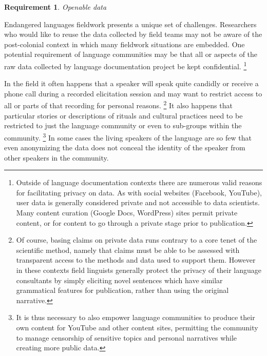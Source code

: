 \documentclass[11pt]{article}
\newtheorem{requirement}{Requirement}
\begin{document}




\begin{requirement}
	\label{req:openable}
       Openable data
\end{requirement}


Endangered languages fieldwork  presents a unique set of
challenges. 
Researchers who would like to reuse the data collected by field teams may not be aware of the
post-colonial context in which many fieldwork situations are embedded.
One potential requirement of language communities may be that all or aspects of
the raw data collected by language documentation project be kept confidential.%
\footnote{Outside of language documentation contexts there are numerous valid reasons for facilitating privacy on data.
As with social websites (Facebook, YouTube), user data is generally considered private and not accessible to data scientists.
Many content curation (Google Docs, WordPress) sites permit private content, or for content to go through a private stage prior to publication.}


In the field it often happens that a speaker will speak quite candidly or
receive a phone call  during a recorded elicitation session and may want to
restrict access to all or parts of that recording for personal reasons.%
\footnote{Of course, basing claims on private data runs contrary to a core
    tenet of the scientific method, namely that claims must be able to be
    assessed with transparent access to the methods and data used to support
    them.  However in these contexts field linguists generally protect the
    privacy of their language consultants by simply eliciting novel sentences
    which have similar grammatical features for publication, rather than using
the original narrative.} %
It also happens that particular stories or descriptions of rituals and cultural
practices need to be restricted to just the language community or even to
sub-groups within the community.%
\footnote{It is thus necessary to also empower language communities to produce
their own content for YouTube and other content sites, permitting the community
to manage censorship of  sensitive topics and personal narratives while
creating more public data.}
In some cases the living speakers of the language are so few that even
anonymizing the data does not conceal the identity of the speaker from other
speakers in the community.
\end{document}
